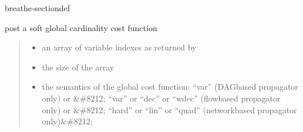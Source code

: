 \documentclass[letterpaper,10pt,openany,oneside,english]{sphinxmanual}
\begin{document}
\begin{fulllineitems}
\begin{sphinxuseclass}{breathe-sectiondef}
\begin{fulllineitems}
\label{\detokenize{ref/ref_cpp:_CPPv4N11WeightedCSP8postWGccEPiiRK6stringRK6string4CostRK6vectorI15BoundedObjValueE}}\label{\detokenize{ref/ref_cpp:_CPPv3N11WeightedCSP8postWGccEPiiRK6stringRK6string4CostRK6vectorI15BoundedObjValueE}}\label{\detokenize{ref/ref_cpp:_CPPv2N11WeightedCSP8postWGccEPiiRK6stringRK6string4CostRK6vectorI15BoundedObjValueE}}\label{\detokenize{ref/ref_cpp:WeightedCSP::postWGcc__iP.i.stringCR.stringCR.Cost.vector:BoundedObjValue:CR}}
\pysigstartsignatures
\pysigstartmultiline
{}
\pysigstopmultiline
\pysigstopsignatures
\sphinxAtStartPar
post a soft global cardinality cost function 
\begin{quote}\begin{description}
\begin{itemize}
\item {} 
\sphinxAtStartPar
{} \textendash{} an array of variable indexes as returned by {\hyperref[\detokenize{ref/ref_cpp:classWeightedCSP_1a2329c94c60817153e45de627c79f8281}]{}} 

\item {} 
\sphinxAtStartPar
{} \textendash{} the size of the array 

\item {} 
\sphinxAtStartPar
{} \textendash{} the semantics of the global cost function: “var” (DAG\sphinxhyphen{}based propagator only) or \&\#8212; “var” or “dec” or “wdec” (flow\sphinxhyphen{}based propagator only) or \&\#8212; “hard” or “lin” or “quad” (network\sphinxhyphen{}based propagator only)\&\#8212; 


\end{itemize}
\end{description}
\end{quote}
\end{fulllineitems}
\end{sphinxuseclass}
\end{fulllineitems}
\end{document}

